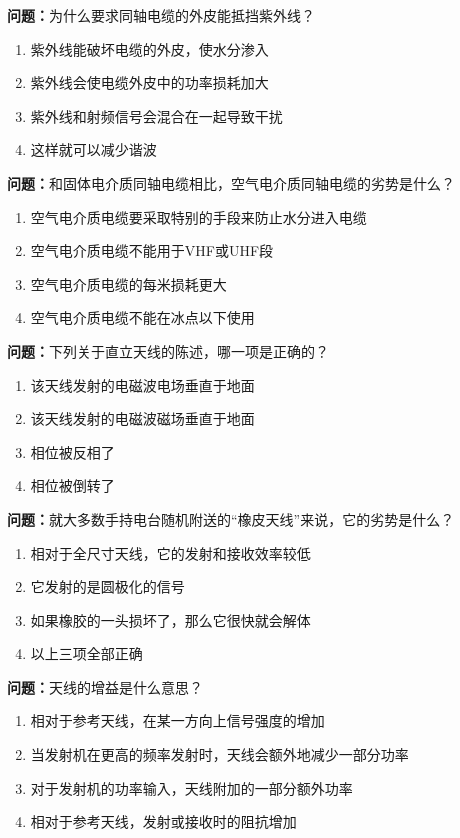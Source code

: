 \documentclass{ctexbook}
\begin{document}
\textbf{问题：}为什么要求同轴电缆的外皮能抵挡紫外线？
\begin{enumerate}[label=\Alph*), leftmargin=3em]
\item 紫外线能破坏电缆的外皮，使水分渗入
\item 紫外线会使电缆外皮中的功率损耗加大
\item 紫外线和射频信号会混合在一起导致干扰
\item 这样就可以减少谐波
\end{enumerate}

\textbf{问题：}和固体电介质同轴电缆相比，空气电介质同轴电缆的劣势是什么？
\begin{enumerate}[label=\Alph*), leftmargin=3em]
\item 空气电介质电缆要采取特别的手段来防止水分进入电缆
\item 空气电介质电缆不能用于VHF或UHF段
\item 空气电介质电缆的每米损耗更大
\item 空气电介质电缆不能在冰点以下使用
\end{enumerate}

\textbf{问题：}下列关于直立天线的陈述，哪一项是正确的？
\begin{enumerate}[label=\Alph*), leftmargin=3em]
\item 该天线发射的电磁波电场垂直于地面
\item 该天线发射的电磁波磁场垂直于地面
\item 相位被反相了
\item 相位被倒转了
\end{enumerate}

\textbf{问题：}就大多数手持电台随机附送的“橡皮天线”来说，它的劣势是什么？
\begin{enumerate}[label=\Alph*), leftmargin=3em]
\item 相对于全尺寸天线，它的发射和接收效率较低
\item 它发射的是圆极化的信号
\item 如果橡胶的一头损坏了，那么它很快就会解体
\item 以上三项全部正确
\end{enumerate}

\textbf{问题：}天线的增益是什么意思？
\begin{enumerate}[label=\Alph*), leftmargin=3em]
\item 相对于参考天线，在某一方向上信号强度的增加
\item 当发射机在更高的频率发射时，天线会额外地减少一部分功率
\item 对于发射机的功率输入，天线附加的一部分额外功率
\item 相对于参考天线，发射或接收时的阻抗增加
\end{enumerate}
\end{document}
